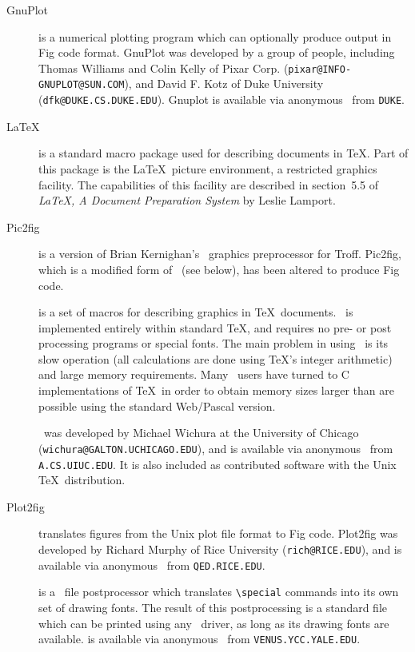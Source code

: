 \begin{description}
\item[GnuPlot]
	is a numerical plotting program which can optionally produce output
	in Fig code format.
GnuPlot was developed by a group of people, including
	Thomas Williams and Colin Kelly of Pixar Corp.
	({\tt pixar@INFO-GNUPLOT@SUN.COM}),
	and David F. Kotz of Duke University ({\tt dfk@DUKE.CS.DUKE.EDU}).
Gnuplot is available via anonymous \FTP\ from {\tt DUKE}.

\item[\LaTeX]
	is a standard macro package used for describing documents in \TeX.
Part of this package is the \LaTeX\ picture environment, a restricted
	graphics facility.
The capabilities of this facility are described in section~5.5 of 
	{\em \LaTeX, A Document Preparation System} by Leslie Lamport.

\item[Pic2fig]
	is a version of Brian Kernighan's \PIC\ graphics preprocessor
	for Troff.
Pic2fig, which is a modified form of \tpic\ (see below), has been altered
	to produce Fig code.
	
\item[\PicTeX]
	is a set of macros for describing graphics in \TeX\ documents.
	\PicTeX\ is implemented entirely within standard \TeX, and requires no
	pre- or post processing programs or special fonts.
The main problem in using \PicTeX\ is its slow operation (all calculations
	are done using \TeX's integer arithmetic) and large memory
	requirements.
Many \PicTeX\ users have turned to C implementations of \TeX\ in order
	to obtain memory sizes larger than are possible using the standard
	Web/Pascal version.

\PicTeX\ was developed by Michael Wichura at the University of
	Chicago ({\tt wichura@GALTON.UCHICAGO.EDU}), and is available via
	anonymous \FTP\  from {\tt A.CS.UIUC.EDU}.
It is also included as contributed software with the Unix \TeX\ distribution.

\item [Plot2fig]
	translates figures from the Unix plot file format to Fig code.
Plot2fig was developed by Richard Murphy of Rice University
	({\tt rich@RICE.EDU}),
	and is available via anonymous \FTP\ from {\tt QED.RICE.EDU}.

\item[\textyl]
	is a \DVI\ file postprocessor which translates {\verb|\special|}
commands into its own set of drawing fonts.
	The result of this postprocessing is a standard \DVI file which
can be printed using any \DVI\ driver, as long as its drawing fonts
	are available.
\textyl is available via anonymous \FTP\ from {\tt VENUS.YCC.YALE.EDU}.


\end{description}
